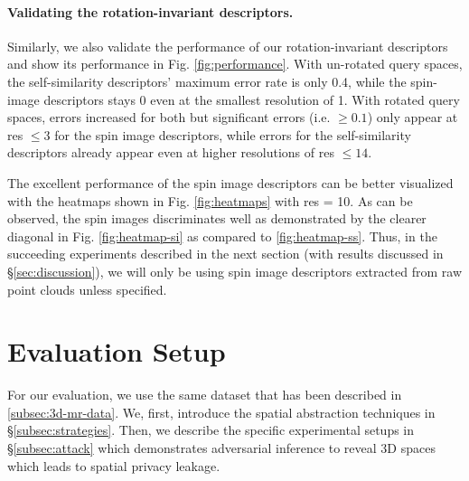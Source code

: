 \paragraph{Validating the rotation-invariant descriptors.} Similarly, we also validate the performance of our rotation-invariant descriptors and show its performance in Fig. \ref{fig:performance}. With un-rotated query spaces, the self-similarity descriptors' maximum error rate is only 0.4, while the spin-image descriptors stays 0 even at the smallest resolution of 1. With rotated query spaces, errors increased for both but significant errors (i.e. $\geq 0.1$) only appear at res $\leq 3$ for the spin image descriptors, while errors for the self-similarity descriptors already appear even at higher resolutions of res $\leq 14$.

The excellent performance of the spin image descriptors can be better visualized with the heatmaps shown in Fig. \ref{fig:heatmaps} with res = 10. As can be observed, the spin images discriminates well as demonstrated by the clearer diagonal in Fig. \ref{fig:heatmap-si} as compared to \ref{fig:heatmap-ss}.
Thus, in the succeeding experiments described in the next section (with results discussed in \S\ref{sec:discussion}), we will only be using spin image descriptors extracted from raw point clouds unless specified.

\section{Evaluation Setup}\label{sec:methodology}%
For our evaluation, we use the same dataset that has been described in \ref{subsec:3d-mr-data}. We, first, introduce the spatial abstraction techniques in \S\ref{subsec:strategies}. Then, we describe the specific experimental setups in \S\ref{subsec:attack} which demonstrates adversarial inference to reveal 3D spaces which leads to spatial privacy leakage.

